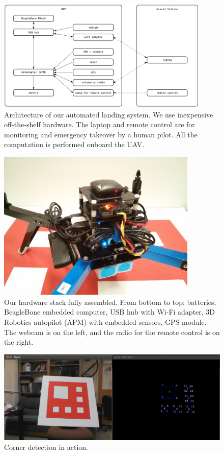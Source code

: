 \documentclass[10pt]{scrartcl} %
\begin{document}
\clearpage

\begin{figure}[h!]
\centering
\includegraphics[width=0.9\textwidth]{images/architecture.png}
\caption{
    Architecture of our automated landing system. We use inexpensive
    off-the-shelf hardware. The laptop and remote control are for
    monitoring and emergency takeover by a human pilot. All the
    computation is performed onboard the UAV.
}
\label{fig:hardware-arch}
\end{figure}

\begin{figure}[h!]
\centering
\includegraphics[width=0.85\textwidth]{images/hardware.jpg}
\caption{
    Our hardware stack fully assembled. From bottom to top: batteries,
    BeagleBone embedded computer, USB hub with Wi-Fi adapter, 3D
    Robotics autopilot (APM) with embedded sensors, GPS module. The
    webcam is on the left, and the radio for the remote control is on
    the right.
}
\label{fig:hardware-photo}
\end{figure}

\begin{figure}[h]
    \centering
    \includegraphics[width=\textwidth]{images/corners.png}
    \caption{Corner detection in action.}
    \label{fig:corners}
\end{figure}
\end{document}
